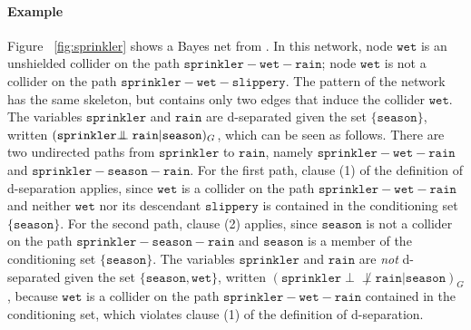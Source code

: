 \documentclass{elsarticle}%
\newtheorem{definition}[theorem]{Definition}
\newcommand{\indep}{\ensuremath{\perp{}\!\!\!\!\!\!\!\perp{}}}
\newcommand{\dep}{\ensuremath{{\perp{}\!\!\!\!\!\!\!\not  \perp{}}}}
\newcommand{\G}{G}
\newcommand{\rain}{\mathtt{rain}}
\newcommand{\wet}{\mathtt{wet}}
\newcommand{\sprinkler}{\mathtt{sprinkler}}
\newcommand{\slippery}{\mathtt{slippery}}
\newcommand{\season}{\mathtt{season}}
\begin{document}

%


\paragraph{Example} Figure ~\ref{fig:sprinkler} shows a Bayes net from \cite[p.15]{pearl00:_causal}. In this network, node $\mathtt{wet}$ is an unshielded collider on the path
$\mathtt{sprinkler}-\mathtt{wet}-\mathtt{rain}$; node
$\mathtt{wet}$ is not a collider on the path $\mathtt{sprinkler}-\mathtt{wet}%
-\mathtt{slippery}$. The pattern of the network has the same skeleton, but
contains only two edges that induce the collider $\mathtt{wet}$. The variables $\mathtt{sprinkler}$ and $\mathtt{rain}$ are d-separated given the set $\{\season\}$, written $(\sprinkler \protect{\indep} \rain|\season)_{\G}$, which can be seen as follows. There are two undirected paths from $\sprinkler$ to $\rain$, namely $\sprinkler-\wet-\rain$ and $\sprinkler-\season-\rain$. For the first path, clause (1) of the definition of d-separation applies, since $\wet$ is a collider on the path $\sprinkler-\wet-\rain$ and neither $\wet$ nor its descendant $\slippery$ is  contained in the conditioning set $\{\season\}$. For the second path, clause (2) applies, since $\season$ is not  a collider on the path $\sprinkler-\season-\rain$ and $\season$ is a member of the conditioning set $\{\season\}$. The variables $\mathtt{sprinkler}$ and $\mathtt{rain}$ are {\em not} d-separated given the set $\{\season,\wet\}$, written $(\sprinkler \dep \rain|\season)_{\G}$, because $\wet$ is a collider on the path $\sprinkler-\wet-\rain$ contained in the conditioning set, which violates clause (1) of the definition of d-separation.
\end{document}
